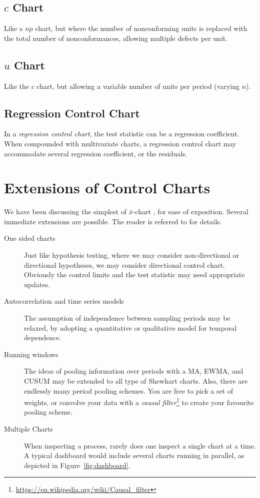 \documentclass[12pt,a4paper]{report}
\theoremstyle{plain}
\theoremstyle{definition}
\newcommand{\barxChart}{$\bar{x}$-chart }
\begin{document}
\subsection{$c$ Chart}
Like a $np$ chart, but where the number of nonconforming units is replaced with the total number of nonconformances, allowing multiple defects per unit. 
\subsection{$u$ Chart}
Like the $c$ chart, but allowing a variable number of units per period (varying $n$).
\subsection{Regression Control Chart}
In a \emph{regression control chart}, the test statistic can be a regression coefficient. 
When compounded with multivariate charts, a regression control chart may accommodate several regression  coefficient, or the residuals. 




\section[Extensions]{Extensions of Control Charts}
We have been discussing the simplest of \barxChart, for ease of exposition.
Several immediate extensions are possible.
The reader is referred to \cite{montgomery_introduction_2007} for details.
\begin{description}

\item [One sided charts] Just like hypothesis testing, where we may consider non-directional or directional hypotheses, we may consider directional control chart. 
Obviously the control limits and the test statistic may need appropriate updates.

\item [Autocorrelation and time series models] The assumption of independence between sampling periods may be relaxed, by adopting a quantitative or qualitative model for temporal dependence.

\item [Running windows] The ideas of pooling information over periods with a MA, EWMA, and CUSUM may be extended to all type of Shewhart charts. 
Also, there are endlessly many period pooling schemes. 
You are free to pick a set of weights, or convolve your data with a \emph{causal filter}\footnote{\url{https://en.wikipedia.org/wiki/Causal_filter}} to create your favourite pooling scheme.

\item [Multiple Charts] When inspecting a process, rarely does one inspect a single chart at a time. A typical dashboard would include several charts running in parallel, as depicted in Figure~\ref{fig:dashboard}.

\end{description}
\end{document}
